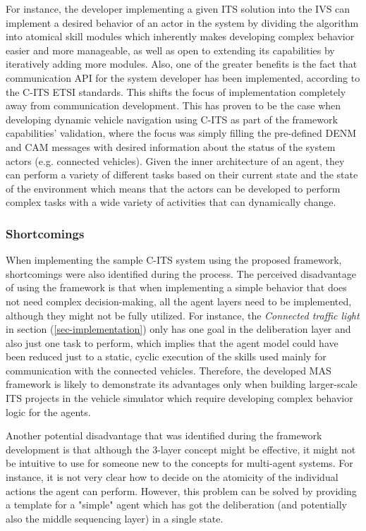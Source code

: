 \documentclass[main.tex]{subfiles}
\begin{document}
For instance, the developer implementing a given ITS solution into the IVS can implement a desired behavior of an actor in 
the system by dividing the algorithm into atomical skill modules which inherently makes developing complex behavior easier and more 
manageable, as well as open to extending its capabilities by iteratively adding more modules. Also, one of the greater benefits is 
the fact that communication API  for the system developer has been implemented, according to the C-ITS ETSI standards. This 
shifts the focus of implementation completely away from communication development. This has proven to be the case when developing 
dynamic vehicle navigation using C-ITS as part of the framework capabilities' validation, where
the focus was simply filling the pre-defined DENM and CAM messages with desired information
about the status of the system actors (e.g. connected vehicles). Given the inner architecture of an agent, they can perform a variety 
of different tasks based on their current state and the state of the environment which means that the actors can be developed 
to perform complex tasks with a wide variety of activities that can dynamically change. 

\subsubsection{Shortcomings}

When implementing the sample C-ITS system using the proposed framework, shortcomings were also
identified during the process. The perceived disadvantage of using the framework is that when
implementing a simple behavior that does not need complex decision-making, all the agent layers
need to be implemented, although they might not be fully utilized. For instance, the
\emph{Connected traffic light} in section (\ref{sec-implementation}) only has one goal in the
deliberation layer and also just one task to perform, which implies that the agent model could
have been reduced just to a static, cyclic execution of the skills used mainly for
communication with the connected vehicles. Therefore, the developed MAS framework is likely to
demonstrate its advantages only when building larger-scale ITS projects in the vehicle
simulator which require developing complex behavior logic for the agents. 

Another potential disadvantage that was identified during the framework development is that
although the 3-layer concept might be effective, it might not be intuitive to use for someone
new to the concepts for multi-agent systems. For instance, it is not very clear how to decide
on the atomicity of the individual actions the agent can perform. However, this problem can be
solved by providing a template for a "simple" agent which has got the deliberation (and
potentially also the middle sequencing layer) in a single state. 
\end{document}
